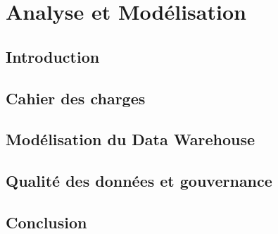 \chapter{Analyse et Modélisation}

\section*{Introduction}

\section{Cahier des charges}


\section{Modélisation du Data Warehouse}


\section{Qualité des données et gouvernance}


\section{Conclusion}


\newpage